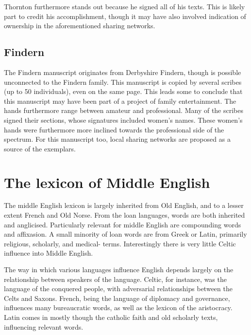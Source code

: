 \documentclass[12pt]{report}
\begin{document}
Thornton furthermore stands out because he signed all of his texts. This is
likely part to credit his accomplishment, though it may have also involved
indication of ownership in the aforementioned sharing networks.

\section{Findern} The Findern manuscript originates from Derbyshire Findern,
though is possible unconnected to the Findern family. This manuscript is copied
by several scribes (up to 50 individuals), even on the same page. This leads
some to conclude that this manuscript may have been part of a project of family
entertainment. The hands furthermore range between amateur and professional.
Many of the scribes signed their sections, whose signatures included women's
names. These women's hands were furthermore more inclined towards the
professional side of the spectrum. For this manuscript too, local sharing
networks are proposed as a source of the exemplars.

\chapter{The lexicon of Middle English}

The middle English lexicon is largely inherited from Old English, and to a
lesser extent French and Old Norse. From the loan languages, words are both
inherited and anglicised. Particularly relevant for middle English are
compounding words and affixasion. A small minority of loan words are from Greek
or Latin, primarily religious, scholarly, and medical- terms. Interestingly
there is very little Celtic influence into Middle English.

The way in which various languages influence English depends largely on the
relationship between speakers of the language. Celtic, for instance, was the
language of the conquered people, with adversarial relationships between the
Celts and Saxons. French, being the language of diplomacy and governance,
influences many bureaucratic words, as well as the lexicon of the aristocracy.
Latin comes in mostly though the catholic faith and old scholarly texts,
influencing relevant words.
\end{document}

